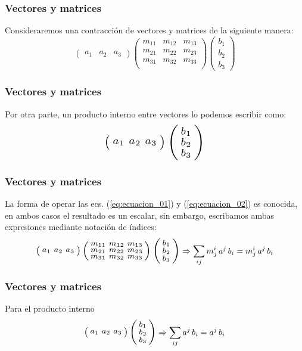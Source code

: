 \documentclass[12pt]{beamer}
\begin{document}
\begin{frame}
\frametitle{Vectores y matrices}
Consideraremos una contracción de vectores y matrices de la siguiente manera:
\begin{equation}
\begin{pmatrix}
a_{1} & a_{2} & a_{3}
\end{pmatrix}
\begin{pmatrix}
m_{11} & m_{12} & m_{13} \\
m_{21} & m_{22} & m_{23} \\
m_{31} & m_{32} & m_{33} \\
\end{pmatrix}
\begin{pmatrix}
b_{1} \\
b_{2} \\
b_{3}
\end{pmatrix}
\label{eq:ecuacion_01}
\end{equation}
\end{frame}
\begin{frame}
\frametitle{Vectores y matrices}
Por otra parte, un producto interno entre vectores lo podemos escribir como:
\begin{equation}
\resizebox{0.35\hsize}{!}{%
$\smqty(\xmat*{a}{1}{3}) \, \smqty(\xmat*{b}{3}{1})$%
}
\label{eq:ecuacion_02}
\end{equation}
\end{frame}
\begin{frame}
\frametitle{Vectores y matrices}
La forma de operar las ecs. (\ref{eq:ecuacion_01}) y (\ref{eq:ecuacion_02}) es conocida, en ambos casos el resultado es un escalar, sin embargo, escribamos ambas expresiones mediante notación de índices:
\begin{equation}
\resizebox{0.5\hsize}{!}{%
$\smqty(\xmat*{a}{1}{3}) \, \smqty(\xmat*{m}{3}{3}) \, \smqty(\xmat*{b}{3}{1})$%
} \Rightarrow \sum_{ij} m_{j}^{i} \, a^{j} \, b_{i} = m_{j}^{i} \, a^{j} \, b_{i} 
\label{eq:ecuacion_03}
\end{equation}
\end{frame}
\begin{frame}
\frametitle{Vectores y matrices}
Para el producto interno
\begin{equation}
\resizebox{0.25\hsize}{!}{%
$\smqty(\xmat*{a}{1}{3}) \, \smqty(\xmat*{b}{3}{1})$%
} \Rightarrow \sum_{ij} a^{j} \, b_{i} = a^{j} \, b_{i}
\label{eq:ecuacion_04}
\end{equation}
\end{frame}
\end{document}
